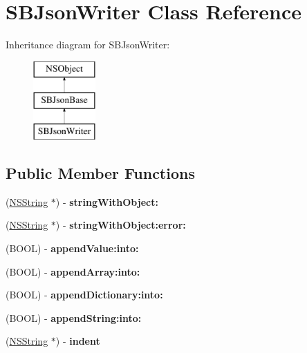 \hypertarget{interface_s_b_json_writer}{
\section{SBJsonWriter Class Reference}
\label{interface_s_b_json_writer}
}
Inheritance diagram for SBJsonWriter:\begin{figure}[H]
\begin{center}
\leavevmode
\includegraphics[height=3.000000cm]{interface_s_b_json_writer}
\end{center}
\end{figure}
\subsection*{Public Member Functions}
\begin{DoxyCompactItemize}
\item 
\hypertarget{interface_s_b_json_writer_a9018ceff9753092b310a43782c5083ed}{
(\hyperlink{class_n_s_string}{NSString} $\ast$) -\/ {\bfseries stringWithObject:}}
\label{interface_s_b_json_writer_a9018ceff9753092b310a43782c5083ed}

\item 
\hypertarget{interface_s_b_json_writer_a41cfe2a66c774790785a841633cc0bc4}{
(\hyperlink{class_n_s_string}{NSString} $\ast$) -\/ {\bfseries stringWithObject:error:}}
\label{interface_s_b_json_writer_a41cfe2a66c774790785a841633cc0bc4}

\item 
\hypertarget{interface_s_b_json_writer_a4364dcbbe231d0fcd36e12efaf107f51}{
(BOOL) -\/ {\bfseries appendValue:into:}}
\label{interface_s_b_json_writer_a4364dcbbe231d0fcd36e12efaf107f51}

\item 
\hypertarget{interface_s_b_json_writer_a5d28358c936d8c3325add8b9cf9c11f2}{
(BOOL) -\/ {\bfseries appendArray:into:}}
\label{interface_s_b_json_writer_a5d28358c936d8c3325add8b9cf9c11f2}

\item 
\hypertarget{interface_s_b_json_writer_ae7b697af01ff6197a5bf1f1cc5eba887}{
(BOOL) -\/ {\bfseries appendDictionary:into:}}
\label{interface_s_b_json_writer_ae7b697af01ff6197a5bf1f1cc5eba887}

\item 
\hypertarget{interface_s_b_json_writer_aa3803962660a20ecec9f100bbd393ff6}{
(BOOL) -\/ {\bfseries appendString:into:}}
\label{interface_s_b_json_writer_aa3803962660a20ecec9f100bbd393ff6}

\item 
\hypertarget{interface_s_b_json_writer_aff5108b4c65eb132d710db30ca1a3d03}{
(\hyperlink{class_n_s_string}{NSString} $\ast$) -\/ {\bfseries indent}}
\label{interface_s_b_json_writer_aff5108b4c65eb132d710db30ca1a3d03}

\end{DoxyCompactItemize}
